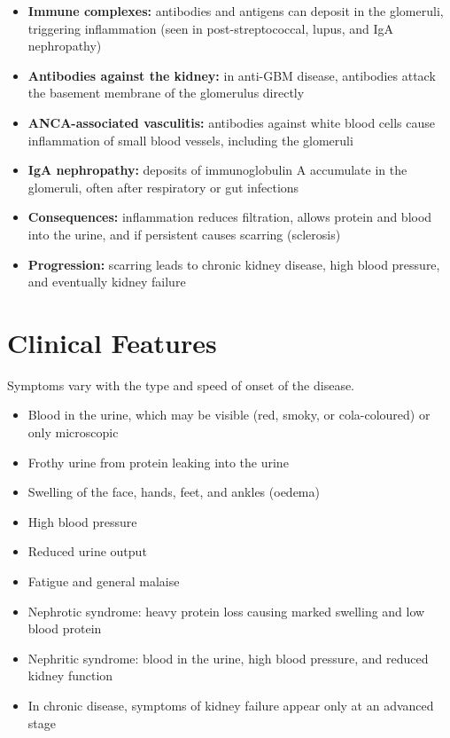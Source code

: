 \begin{itemize}
    \item \textbf{Immune complexes:} antibodies and antigens can deposit in the glomeruli, triggering inflammation (seen in post-streptococcal, lupus, and IgA nephropathy)
    \item \textbf{Antibodies against the kidney:} in anti-GBM disease, antibodies attack the basement membrane of the glomerulus directly
    \item \textbf{ANCA-associated vasculitis:} antibodies against white blood cells cause inflammation of small blood vessels, including the glomeruli
    \item \textbf{IgA nephropathy:} deposits of immunoglobulin A accumulate in the glomeruli, often after respiratory or gut infections
    \item \textbf{Consequences:} inflammation reduces filtration, allows protein and blood into the urine, and if persistent causes scarring (sclerosis)
    \item \textbf{Progression:} scarring leads to chronic kidney disease, high blood pressure, and eventually kidney failure
\end{itemize}

\section*{Clinical Features}
Symptoms vary with the type and speed of onset of the disease.

\begin{itemize}
    \item Blood in the urine, which may be visible (red, smoky, or cola-coloured) or only microscopic
    \item Frothy urine from protein leaking into the urine
    \item Swelling of the face, hands, feet, and ankles (oedema)
    \item High blood pressure
    \item Reduced urine output
    \item Fatigue and general malaise
    \item Nephrotic syndrome: heavy protein loss causing marked swelling and low blood protein
    \item Nephritic syndrome: blood in the urine, high blood pressure, and reduced kidney function
    \item In chronic disease, symptoms of kidney failure appear only at an advanced stage
\end{itemize}

